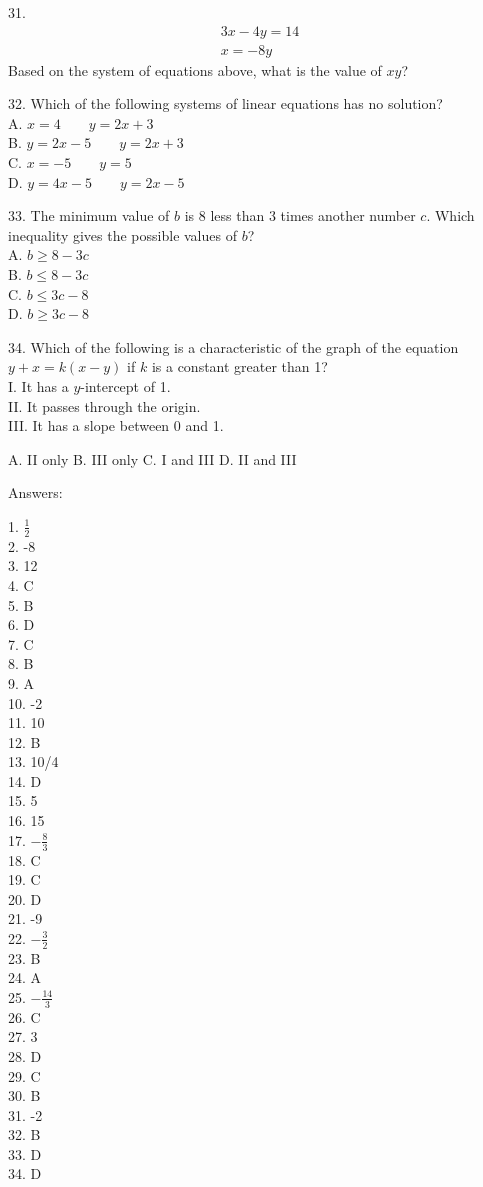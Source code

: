 \documentclass[../satmath.tex]{subfiles}
\begin{document}
31. 
\begin{align*}
3x-4y=14\\
x=-8y
\end{align*}
Based on the system of equations above, what is the value of $xy$?
\medbreak

32. Which of the following systems of linear equations has no solution?\\
A. $x=4\qquad y=2x+3$\\
B. $y=2x-5 \qquad y=2x+3$\\
C. $x=-5 \qquad y=5$\\
D. $y=4x-5 \qquad y=2x-5$
\medbreak

33. The minimum value of $b$ is 8 less than 3 times another number $c$. Which inequality gives the possible values of $b$?\\
A. $b\geq 8-3c$\\
B. $b\leq 8-3c$\\
C. $b\leq 3c-8$\\
D. $b\geq 3c-8$
\medbreak

34. Which of the following is a characteristic of the graph of the equation $y+x=k(x-y)$ if $k$ is a constant greater than 1?\\
I. It has a $y$-intercept of 1.\\
II. It passes through the origin.\\
III. It has a slope between 0 and 1.

A. II only \quad B. III only \quad C. I and III \quad D. II and III
\medbreak

Answers:

1. $\frac{1}{2}$\\
2. -8\\
3. 12\\
4. C\\
5. B\\
6. D\\
7. C\\
8. B\\
9. A\\
10. -2\\
11. 10\\
12. B\\
13. 10/4\\
14. D\\
15. 5\\
16. 15\\
17. $-\frac{8}{3}$\\
18. C\\
19. C\\
20. D\\
21. -9\\
22. $-\frac{3}{2}$\\
23. B\\
24. A\\
25. $-\frac{14}{3}$\\
26. C\\
27. 3\\
28. D\\
29. C\\
30. B\\
31. -2\\
32. B\\
33. D\\
34. D
\end{document}
